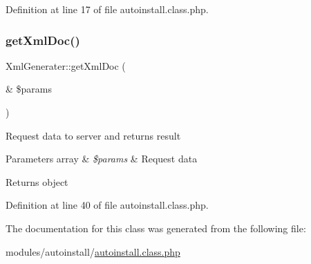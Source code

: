 Definition at line 17 of file autoinstall.\+class.\+php.

\hypertarget{classXmlGenerater_a2c76cbd93596f5f7d48ff2ff0b9213ce}{}\label{classXmlGenerater_a2c76cbd93596f5f7d48ff2ff0b9213ce} 
\subsubsection{\texorpdfstring{get\+Xml\+Doc()}{getXmlDoc()}}
{\footnotesize\ttfamily Xml\+Generater\+::get\+Xml\+Doc (\begin{DoxyParamCaption}\item[{\&}]{\$params }\end{DoxyParamCaption})}

Request data to server and returns result


\begin{DoxyParams}[1]{Parameters}
array & {\em \$params} & Request data \\
\hline
\end{DoxyParams}
\begin{DoxyReturn}{Returns}
object 
\end{DoxyReturn}


Definition at line 40 of file autoinstall.\+class.\+php.



The documentation for this class was generated from the following file\+:\begin{DoxyCompactItemize}
\item 
modules/autoinstall/\hyperlink{autoinstall_8class_8php}{autoinstall.\+class.\+php}\end{DoxyCompactItemize}
